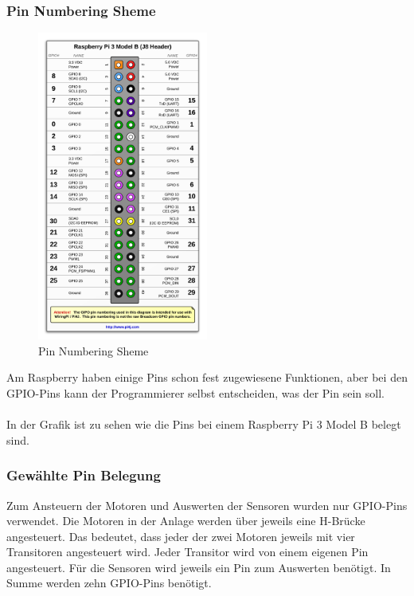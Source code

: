 \newpage

\subsubsection{Pin Numbering Sheme}

\begin{figure}
\vspace{-40pt}
  \begin{center}
    \includegraphics[width=0.50\textwidth]{Bilder/pi4j/PinNumberingSheme}
  \end{center}
  \caption{Pin Numbering Sheme}
  \label{Magazin Vorne}
  \vspace{-320pt}
\end{figure}

Am Raspberry haben einige Pins schon fest zugewiesene Funktionen, aber bei den GPIO-Pins kann der Programmierer selbst entscheiden, was der Pin sein soll.
\\ \\
In der Grafik ist zu sehen wie die Pins bei einem Raspberry Pi 3 Model B belegt sind.

\vspace{300pt}

\subsubsection{Gewählte Pin Belegung}
Zum Ansteuern der Motoren und Auswerten der Sensoren wurden nur GPIO-Pins verwendet. Die Motoren in der Anlage werden über jeweils eine H-Brücke angesteuert. Das bedeutet, dass jeder der zwei Motoren jeweils mit vier Transitoren angesteuert wird. Jeder Transitor wird von einem eigenen Pin angesteuert. Für die Sensoren wird jeweils ein Pin zum Auswerten benötigt. In Summe werden zehn GPIO-Pins benötigt. 

